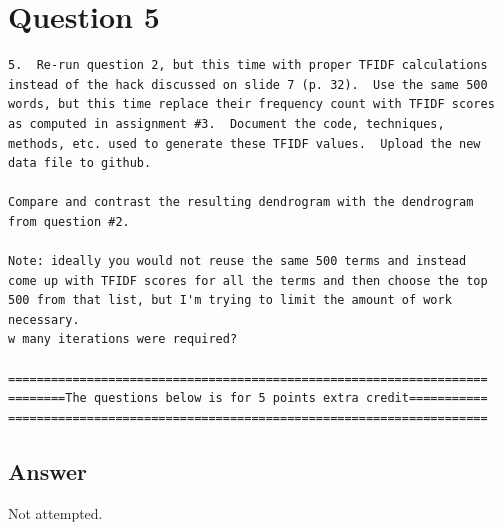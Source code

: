 \documentclass[letterpaper,10pt]{article}
\begin{document}
\section*{Question 5}
\begin{verbatim}
5.  Re-run question 2, but this time with proper TFIDF calculations
instead of the hack discussed on slide 7 (p. 32).  Use the same 500
words, but this time replace their frequency count with TFIDF scores
as computed in assignment #3.  Document the code, techniques,
methods, etc. used to generate these TFIDF values.  Upload the new
data file to github.

Compare and contrast the resulting dendrogram with the dendrogram
from question #2.

Note: ideally you would not reuse the same 500 terms and instead
come up with TFIDF scores for all the terms and then choose the top
500 from that list, but I'm trying to limit the amount of work
necessary.
w many iterations were required?

===================================================================
========The questions below is for 5 points extra credit===========
===================================================================
\end{verbatim}
\subsection*{Answer}
Not attempted. 
\end{document}
